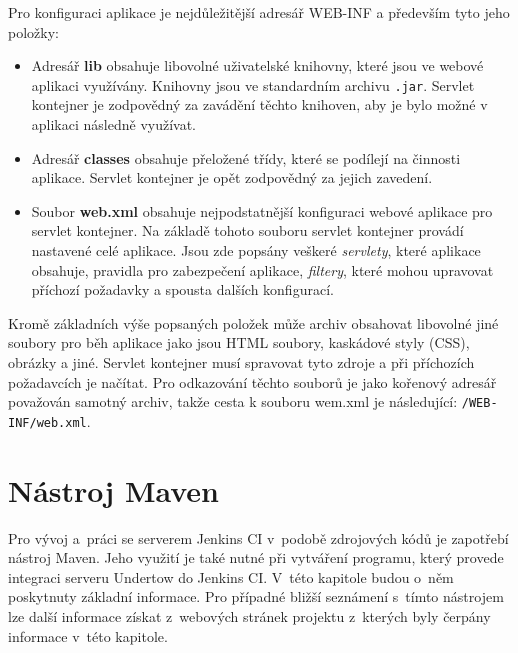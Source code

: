             Pro konfiguraci aplikace je nejdůležitější adresář WEB-INF a především tyto jeho položky:

            \begin{itemize}
                \item Adresář \textbf{lib} obsahuje libovolné uživatelské knihovny, které jsou ve webové aplikaci využívány. 
                    Knihovny jsou ve standardním archivu \texttt{.jar}.
                    Servlet kontejner je zodpovědný za zavádění těchto knihoven, aby je bylo možné v aplikaci následně využívat.

                \item Adresář \textbf{classes} obsahuje přeložené třídy, které se podílejí na činnosti aplikace. 
                    Servlet kontejner je opět zodpovědný za jejich zavedení. 

                \item Soubor \textbf{web.xml} obsahuje nejpodstatnější konfiguraci webové aplikace pro servlet kontejner.
                    Na základě tohoto souboru servlet kontejner provádí nastavené celé aplikace.
                    Jsou zde popsány veškeré \emph{servlety}, které aplikace obsahuje, pravidla pro zabezpečení aplikace,
                    \emph{filtery}, které mohou upravovat příchozí požadavky a spousta dalších konfigurací. 
            \end{itemize}

            Kromě základních výše popsaných položek může archiv obsahovat libovolné jiné soubory pro běh aplikace jako jsou 
            HTML soubory, kaskádové styly (CSS), obrázky a jiné. Servlet kontejner musí spravovat tyto zdroje
            a při příchozích požadavcích je načítat. Pro odkazování těchto souborů je jako kořenový adresář považován
            samotný archiv, takže cesta k souboru wem.xml je následující: \texttt{/WEB-INF/web.xml}.

            
         
    \section{Nástroj Maven} \label{maven}
        Pro vývoj a~práci se serverem Jenkins CI v~podobě zdrojových kódů je zapotřebí nástroj Maven. 
        Jeho využití je také nutné při vytváření programu, který provede integraci serveru Undertow do Jenkins CI. 
        V~této kapitole budou o~něm poskytnuty základní informace. Pro případné bližší
        seznámení s~tímto nástrojem lze další informace získat z~webových stránek projektu \cite{mavenWeb}
        z~kterých byly čerpány informace v~této kapitole. 
        
